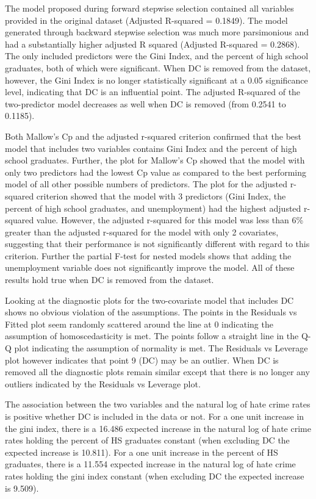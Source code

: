 \documentclass[
]{article}
\begin{document}
The model proposed during forward stepwise selection contained all
variables provided in the original dataset (Adjusted R-squared =
0.1849). The model generated through backward stepwise selection was
much more parsimonious and had a substantially higher adjusted R squared
(Adjusted R-squared = 0.2868). The only included predictors were the
Gini Index, and the percent of high school graduates, both of which were
significant. When DC is removed from the dataset, however, the Gini
Index is no longer statistically significant at a 0.05 significance
level, indicating that DC is an influential point. The adjusted
R-squared of the two-predictor model decreases as well when DC is
removed (from 0.2541 to 0.1185).

Both Mallow's Cp and the adjusted r-squared criterion confirmed that the
best model that includes two variables contains Gini Index and the
percent of high school graduates. Further, the plot for Mallow's Cp
showed that the model with only two predictors had the lowest Cp value
as compared to the best performing model of all other possible numbers
of predictors. The plot for the adjusted r-squared criterion showed that
the model with 3 predictors (Gini Index, the percent of high school
graduates, and unemployment) had the highest adjusted r-squared value.
However, the adjusted r-squared for this model was less than 6\% greater
than the adjusted r-squared for the model with only 2 covariates,
suggesting that their performance is not significantly different with
regard to this criterion. Further the partial F-test for nested models
shows that adding the unemployment variable does not significantly
improve the model. All of these results hold true when DC is removed
from the dataset.

Looking at the diagnostic plots for the two-covariate model that
includes DC shows no obvious violation of the assumptions. The points in
the Residuals vs Fitted plot seem randomly scattered around the line at
0 indicating the assumption of homoscedasticity is met. The points
follow a straight line in the Q-Q plot indicating the assumption of
normality is met. The Residuals vs Leverage plot however indicates that
point 9 (DC) may be an outlier. When DC is removed all the diagnostic
plots remain similar except that there is no longer any outliers
indicated by the Residuals vs Leverage plot.

The association between the two variables and the natural log of hate
crime rates is positive whether DC is included in the data or not. For a
one unit increase in the gini index, there is a 16.486 expected increase
in the natural log of hate crime rates holding the percent of HS
graduates constant (when excluding DC the expected increase is 10.811).
For a one unit increase in the percent of HS graduates, there is a
11.554 expected increase in the natural log of hate crime rates holding
the gini index constant (when excluding DC the expected increase is
9.509).
\end{document}
